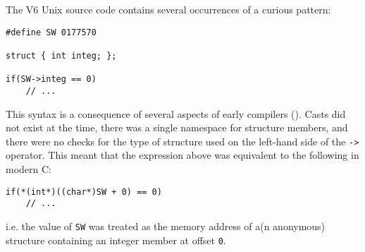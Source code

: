 The V6 Unix source code contains several occurrences of a curious pattern:

\begin{lstlisting}[style=c]
#define SW 0177570

struct { int integ; };

if(SW->integ == 0)
    // ...
\end{lstlisting}

This syntax is a consequence of several aspects of early compilers
(\cite{Lions1977}).  Casts did not exist at the time, there was a single
namespace for structure members, and there were no checks for the type of
structure used on the left-hand side of the \texttt{->} operator.  This meant
that the expression above was equivalent to the following in modern C:

\begin{lstlisting}[style=c]
if(*(int*)((char*)SW + 0) == 0)
    // ...
\end{lstlisting}

i.e. the value of \texttt{SW} was treated as the memory address of a(n
anonymous) structure containing an integer member at offset \texttt{0}.
